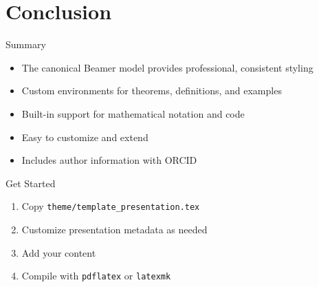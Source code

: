 \documentclass[aspectratio=169]{beamer}
\begin{document}
\section{Conclusion}

\begin{frame}{Summary}
  \begin{itemize}
    \item The canonical Beamer model provides professional, consistent styling
    \item Custom environments for theorems, definitions, and examples
    \item Built-in support for mathematical notation and code
    \item Easy to customize and extend
    \item Includes author information with ORCID
  \end{itemize}

  \vspace{1em}

  \begin{block}{Get Started}
    \begin{enumerate}
      \item Copy \texttt{theme/template\_presentation.tex}
      \item Customize presentation metadata as needed
      \item Add your content
      \item Compile with \texttt{pdflatex} or \texttt{latexmk}
    \end{enumerate}
  \end{block}
\end{frame}


\contactslide
\end{document}
